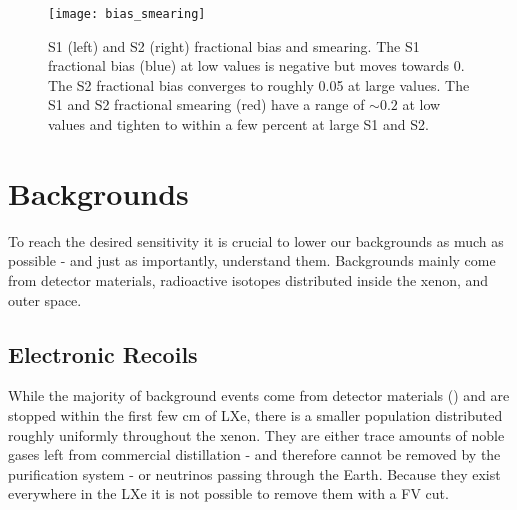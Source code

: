 \begin{figure}
\centering
\texttt{[image: bias\_smearing]}
\caption{S1 (left) and S2 (right) fractional bias and smearing.  The S1 fractional bias (blue) at low values is negative but moves towards
0.  The S2 fractional bias converges to roughly 0.05 at large values.  The S1 and S2 fractional smearing (red) have a range of ${\sim}0.2$
at low values and tighten to within a few percent at large S1 and S2.}
\label{fig:det_char_bias_smearing_s1_s1}
\end{figure}



\section{Backgrounds}
\label{sec:backgrounds}
To reach the desired sensitivity it is crucial to lower our backgrounds as much as possible - and just as importantly, understand
them.  Backgrounds mainly come from detector materials, radioactive isotopes distributed inside the xenon, and outer space.



\subsection{Electronic Recoils}
\label{subsec:backgrounds_electronic}
While the majority of background events come from detector materials () and are stopped within the
first few cm of LXe, there is a smaller population distributed roughly uniformly throughout the xenon.  They are either trace amounts
of noble gases left from commercial distillation - and therefore cannot be removed by the purification system - or neutrinos passing
through the Earth.  Because they exist everywhere in the LXe it is not possible to remove them with a FV cut.



